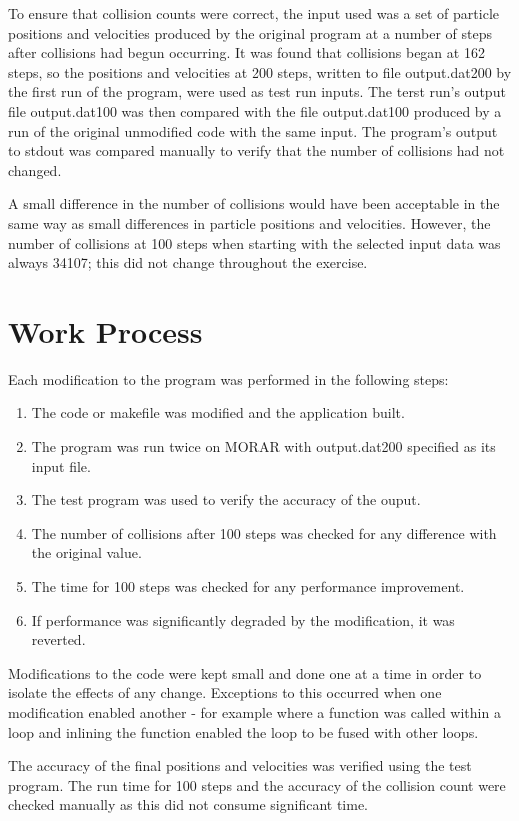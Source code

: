 \documentclass[11pt, oneside]{article}   %
\begin{document}
To ensure that collision counts were correct, the input used was a set of particle positions and velocities produced by the original program at a number of steps after collisions had begun occurring.
It was found that collisions began at 162 steps, so the positions and velocities at 200 steps, written to file output.dat200 by the first run of the program, were used as test run inputs.
The terst run's output file output.dat100 was then compared with the file output.dat100 produced by a run of the original unmodified code with the same input.
The program's output to stdout was compared manually to verify that the number of collisions had not changed.

A small difference in the number of collisions would have been acceptable in the same way as small differences in particle positions and velocities.
However, the number of collisions at 100 steps when starting with the selected input data was always 34107; this did not change throughout the exercise.

\section{Work Process}
Each modification to the program was performed in the following steps:

\begin{enumerate}
	\item The code or makefile was modified and the application built.
	\item The program was run twice on MORAR with output.dat200 specified as its input file.
	\item The test program was used to verify the accuracy of the ouput.
	\item The number of collisions after 100 steps was checked for any difference with the original value.
	\item The time for 100 steps was checked for any performance improvement.
	\item If performance was significantly degraded by the modification, it was reverted. 
\end{enumerate}

Modifications to the code were kept small and done one at a time in order to isolate the effects of any change.
Exceptions to this occurred when one modification enabled another - for example where a function was called within a loop and inlining the function enabled the loop to be fused with other loops.

The accuracy of the final positions and velocities was verified using the test program.
The run time for 100 steps and the accuracy of the collision count were checked manually as this did not consume significant time.
\end{document}
